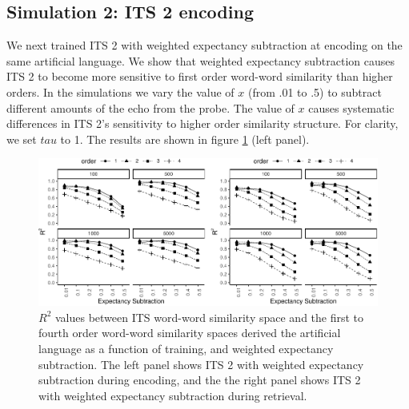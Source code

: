 \documentclass[10pt,letterpaper]{article}
\begin{document}
\subsection{Simulation 2: ITS 2 encoding}

We next trained ITS 2 with weighted expectancy subtraction at encoding on the same artificial language. We show that weighted expectancy subtraction causes ITS 2 to become more sensitive to first order word-word similarity than higher orders. In the simulations we vary the value of \(x\) (from .01 to .5) to subtract different amounts of the echo from the probe. The value of \(x\) causes systematic differences in ITS 2's sensitivity to higher order similarity structure. For clarity, we set \(tau\) to 1. The results are shown in figure \ref{fig:allsims} (left panel).

\begin{figure}

\includegraphics[width=\textwidth]{ITS_cogsci_files/figure-latex/allsims-1.pdf}

\caption{\(R^2\) values between ITS word-word similarity space and the first to fourth order word-word similarity spaces derived the artificial language as a function of training, and weighted expectancy subtraction. The left panel shows ITS 2 with weighted expectancy subtraction during encoding, and the the right panel shows ITS 2 with weighted expectancy subtraction during retrieval.}\label{fig:allsims}
\end{figure}

\end{document}
